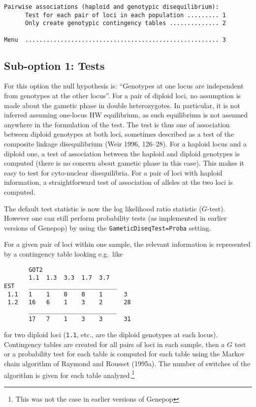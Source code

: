 \documentclass[12pt,]{book}
\let\rmarkdownfootnote\footnote%
\def\footnote{\protect\rmarkdownfootnote}
\begin{document}
\begin{verbatim}
Pairwise associations (haploid and genotypic disequilibrium):
      Test for each pair of loci in each population ......... 1
      Only create genotypic contingency tables .............. 2

Menu  ....................................................... 3
\end{verbatim}

\subsection{Sub-option 1: Tests}\label{sub-option-1-tests}

For this option the null hypothesis is: ``Genotypes at one locus are
independent from genotypes at the other locus''. For a pair of diploid
loci, no assumption is made about the gametic phase in double
heterozygotes. In particular, it is not inferred assuming one-locus HW
equilibrium, as such equilibrium is not assumed anywhere in the
formulation of the test. The test is thus one of association between
diploid genotypes at both loci, sometimes described as a test of the
composite linkage disequilibrium
(Weir 1996, 126--28). For a haploid locus and a diploid one, a test of
association between the haploid and diploid genotypes is computed (there
is no concern about gametic phase in this case). This makes it easy to
test for cyto-nuclear
disequilibria. For a pair of
loci with haploid information, a straightforward test of association of
alleles at the two loci is computed.

The default test statistic is now the log likelihood ratio statistic
(\(G\)-test). However one can still perform probability tests (as
implemented in earlier versions of Genepop) by using the
\texttt{GameticDiseqTest=Proba} setting.

For a given pair of loci within one sample, the relevant information is
represented by a contingency table looking e.g.~like

\begin{verbatim}
       GOT2
       1.1  1.3  3.3  1.7  3.7
EST    _________________________
 1.1   1    1    0    0    1      3
 1.2   16   6    1    3    2      28
       _________________________
       17   7    1    3    3      31
\end{verbatim}

for two diploid loci (\texttt{1.1}, etc., are the diploid genotypes at
each locus). Contingency tables are created for all pairs of loci in
each sample, then a \(G\) test or a probability test for each table is
computed for each table using the Markov chain algorithm of Raymond and
Rousset (1995a). The number of
switches of the algorithm is
given for each table analyzed.\footnote{This was not the case in earlier
  versions of Genepop}
\end{document}
